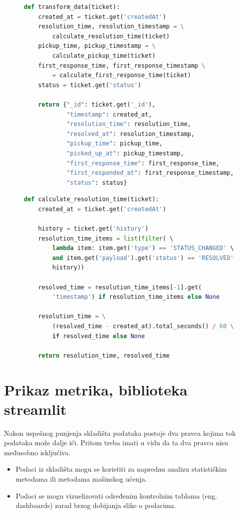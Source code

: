 \documentclass[12pt,oneside]{memoir}
\begin{document}
\begin{figure}[h]
\begin{lstlisting}[language=python, caption={Funkcija koja transformiše podatke.}, label={lst:ticketetltransformfunction}]
def transform_data(ticket):
    created_at = ticket.get('createdAt')
    resolution_time, resolution_timestamp = \
        calculate_resolution_time(ticket)
    pickup_time, pickup_timestamp = \
        calculate_pickup_time(ticket)
    first_response_time, first_response_timestamp \
        = calculate_first_response_time(ticket)
    status = ticket.get('status')

    return {"_id": ticket.get('_id'),
            "timestamp": created_at,
            "resolution_time": resolution_time,
            "resolved_at": resolution_timestamp,
            "pickup_time": pickup_time,
            "picked_up_at": pickup_timestamp,
            "first_response_time": first_response_time,
            "first_responded_at": first_response_timestamp,
            "status": status}
\end{lstlisting}
\end{figure}

\begin{figure}[h]
\begin{lstlisting}[language=python, caption={Računanje konkretne metrike.}, label={lst:ticketetlconcretefunction}]
def calculate_resolution_time(ticket):
    created_at = ticket.get('createdAt')

    history = ticket.get('history')
    resolution_time_items = list(filter( \ 
        lambda item: item.get('type') == 'STATUS_CHANGED' \
        and item.get('payload').get('status') == 'RESOLVED', \
        history))

    resolved_time = resolution_time_items[-1].get(
        'timestamp') if resolution_time_items else None

    resolution_time = \
        (resolved_time - created_at).total_seconds() / 60 \
        if resolved_time else None

    return resolution_time, resolved_time
\end{lstlisting}
\end{figure}



\newpage
\section{Prikaz metrika, biblioteka streamlit}

Nakon uspešnog punjenja skladišta podataka postoje dva pravca kojima tok podataka može dalje ići. Pritom treba imati u vidu da ta dva pravca nisu međusobno isključiva.
\begin{itemize}
    \item Podaci iz skladišta mogu se koristiti za naprednu analizu statističkim metodama ili metodama mašinskog učenja.
    \item Podaci se mogu vizuelizovati određenim kontrolnim tablama (eng. dashboards) zarad brzog dobijanja slike o podacima.
\end{itemize}
\end{document}

